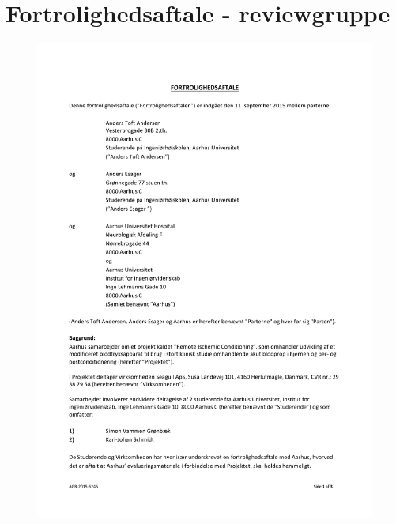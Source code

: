 \section{Fortrolighedsaftale - reviewgruppe} \label{app:tavshedserkl}
\begin{figure}[H]
	\includegraphics[width = 1\textwidth]{billeder/FortrolighedsaftaleSide1.pdf}
\end{figure}
\newpage
